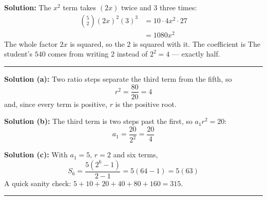\documentclass[12pt]{article}
\begin{document}
\textbf{Solution:} The $x^2$ term takes $(2x)$ twice and $3$ three times:
\begin{align*}
  \binom{5}{2}(2x)^2(3)^3 &= 10 \cdot 4x^2 \cdot 27 \\
                          &= 1080x^2
\end{align*}
The whole factor $2x$ is squared, so the $2$ is squared with it. The coefficient is
The student's $540$ comes from writing $2$ instead of $2^2 = 4$ --- exactly half.

\vspace{0.2cm}\noindent\rule{\linewidth}{0.2pt}


\textbf{Solution (a):} Two ratio steps separate the third term from the fifth, so
\[ r^2 = \frac{80}{20} = 4 \]
and, since every term is positive, $r$ is the positive root. 

\textbf{Solution (b):} The third term is two steps past the first, so $a_1 r^2 = 20$:
\[ a_1 = \frac{20}{2^2} = \frac{20}{4} \]

\textbf{Solution (c):} With $a_1 = 5$, $r = 2$ and six terms,
\[ S_6 = \frac{5(2^6 - 1)}{2 - 1} = 5(64 - 1) = 5(63) \]
A quick sanity check: $5 + 10 + 20 + 40 + 80 + 160 = 315$.

\vspace{0.2cm}\noindent\rule{\linewidth}{0.2pt}
\end{document}
